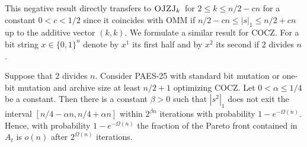 \documentclass[
sigconf = false, %
review = false, %
screen = true, %
anonymous = true, %
format=acmsmall
]{acmart}
\newcommand{\ones}[1]{|#1|_1}
\newcommand{\OMM}{\textsc{OMM}\xspace}
\newcommand{\COCZ}{\textsc{COCZ}\xspace}
\newcommand{\ojzjk}{$\textsc{OJZJ}_k\xspace$}
\newcommand{\PAES}{PAES-25\xspace}
\begin{document}
This negative result directly transfers to \ojzjk \, for $2 \leq k \leq n/2-cn$ for a constant $0<c<1/2$ since it coincides with \OMM if $n/2-cn \leq \ones{s} \leq n/2+c n$ up to the additive vector $(k,k)$. We formulate a similar result for \COCZ. For a bit string $x \in \{0,1\}^n$ denote by $x^1$ its first half and by $x^2$ its second if $2$ divides $n$.

\begin{theorem}
\label{thm:spreading-Pareto-front-cocz}
    Suppose that $2$ divides $n$. Consider \PAES with standard bit mutation or one-bit mutation and archive size at least $n/2+1$ optimizing \COCZ. Let $0 < \alpha \leq 1/4$ be a constant. Then there is a constant $\beta>0$ such that $\ones{s^2}$ does not exit the interval $[n/4-\alpha n,n/4+\alpha n]$ within $2^{\beta n}$ iterations with probability $1-e^{-\Omega(n)}$. Hence, with probability $1-e^{-\Omega(n)}$ the fraction of the Pareto front contained in $A_t$ is $o(n)$ after $2^{\Omega(n)}$ iterations. 
\end{theorem}
\end{document}
